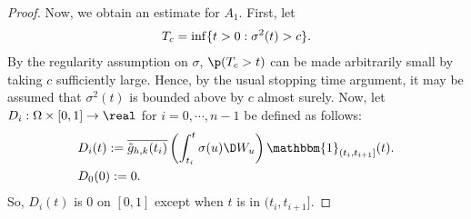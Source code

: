 \begin{proof}
Now, we obtain an estimate for $A_{1}$. First, let 
\begin{align}
  T_c = \inf \{ t >0 : \sigma^2(t) > c \}\notag.
  \label{}
\end{align}
By the regularity assumption on $\sigma$, $\p(T_c > t)$ can be made arbitrarily small by taking $c$ sufficiently large.  Hence, by the usual stopping time argument, it may be assumed that $\sigma^2(t)$ is bounded above by $c$ almost surely.  Now, let $D_i: \Omega\times[0,1] \to \real$ for $i = 0, \cdots, n-1$ be defined as follows:  
\begin{align}
&D_{i}(t) := \btghki\left(\int_{t_i}^{t} \sigma(u)\D W_u\right)\mathbbm{1}_{(t_i, t_{i+1}]}(t).
  \label{eq:Di}\\
&D_0(0) := 0.
\end{align}
So, $D_i(t)$ is 0 on $[0,1]$ except when $t$ is in $(t_i, t_{i+1}]$.



\end{proof}
